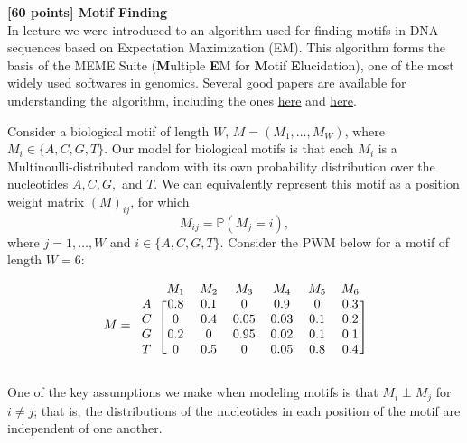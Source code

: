 
{\bf [60 points] Motif Finding}\\

In lecture we were introduced to an algorithm used for finding motifs in DNA sequences based on Expectation Maximization (EM). This algorithm forms the basis of the MEME Suite (\textbf{M}ultiple \textbf{E}M for \textbf{M}otif \textbf{E}lucidation), one of the most widely used softwares in genomics. Several good papers are available for understanding the algorithm, including the ones \href{https://www.cs.cmu.edu/~epxing/Class/10810-06/readings/MEME.pdf}{here} and \href{https://tlbailey.bitbucket.io/papers/meme.ml.pdf}{here}.


Consider a biological motif of length $W$, $M = (M_1, \dots, M_W)$, where $M_i \in \{A, C, G, T\}$. Our model for biological motifs is that each $M_i$ is a Multinoulli-distributed random with its own probability distribution over the nucleotides $A, C, G,$ and $T$.
We can equivalently represent this motif as a position weight matrix $(M)_{ij}$, for which 
$$M_{ij} = \mathbb P(M_j = i),$$
where $j = 1, \dots, W$ and $i \in \{A, C, G, T\}$. Consider the PWM below for a motif of length $W=6$: 

\begin{equation}
M = \begin{blockarray}{ccccccc}
& M_1 & M_2 & M_3 & M_4 & M_5 & M_6 \\
\begin{block}{c[cccccc]}
  A & 0.8 & 0.1 & 0 & 0.9 & 0 & 0.3  \\
  C & 0 & 0.4 & 0.05 & 0.03 & 0.1 & 0.2 \\
  G & 0.2 & 0 & 0.95 & 0.02 & 0.1 & 0.1 \\
  T & 0 & 0.5 & 0 & 0.05 & 0.8 & 0.4  \\
\end{block}
\end{blockarray}
\label{q2-motif-pwm}
\end{equation}

One of the key assumptions we make when modeling motifs is that $M_i \perp M_j$ for $i \ne j$; that is, the distributions of the nucleotides in each position of the motif are independent of one another. 

